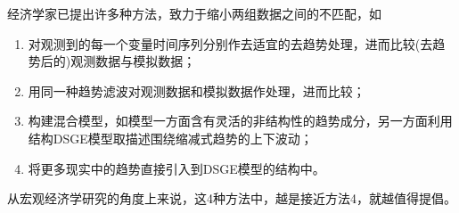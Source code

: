 经济学家已提出许多种方法，致力于缩小两组数据之间的不匹配，如
\begin{enumerate}
  \item 对观测到的每一个变量时间序列分别作去适宜的去趋势处理，进而比较(去趋势后的)观测数据与模拟数据；
  \item 用同一种趋势滤波对观测数据和模拟数据作处理，进而比较；
  \item 构建混合模型，如\cite{Canova:2014be}模型一方面含有灵活的非结构性的趋势成分，另一方面利用结构DSGE模型取描述围绕缩减式趋势的上下波动；
  \item 将更多现实中的趋势直接引入到DSGE模型的结构中。
\end{enumerate}

从宏观经济学研究的角度上来说，这4种方法中，越是接近方法4，就越值得提倡。
